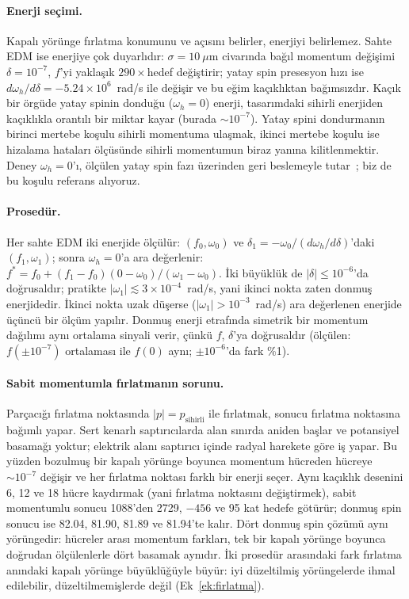 \documentclass[11pt,a4paper]{article}
\begin{document}
\paragraph{Enerji seçimi.} Kapalı yörünge fırlatma konumunu ve açısını belirler, enerjiyi belirlemez. Sahte
EDM ise enerjiye çok duyarlıdır: $\sigma=10~\mu$m civarında bağıl momentum değişimi $\delta=10^{-7}$, $f$'yi
yaklaşık $290\times$hedef değiştirir; yatay spin presesyon hızı ise $d\omega_h/d\delta=-5.24\times10^6$~rad/s
ile değişir ve bu eğim kaçıklıktan bağımsızdır. Kaçık bir örgüde yatay spinin donduğu ($\omega_h=0$) enerji,
tasarımdaki sihirli enerjiden kaçıklıkla orantılı bir miktar kayar (burada $\sim10^{-7}$). Yatay spini
dondurmanın birinci mertebe koşulu sihirli momentuma ulaşmak, ikinci mertebe koşulu ise hizalama hataları
ölçüsünde sihirli momentumun biraz yanına kilitlenmektir. Deney $\omega_h=0$'ı, ölçülen yatay spin fazı
üzerinden geri beslemeyle tutar~\cite{jedi_phaselock}; biz de bu koşulu referans alıyoruz.

\paragraph{Prosedür.} Her sahte EDM iki enerjide ölçülür: $(f_0,\omega_0)$ ve
$\delta_1=-\omega_0/(d\omega_h/d\delta)$'daki $(f_1,\omega_1)$; sonra $\omega_h=0$'a ara değerlenir:
$f^*=f_0+(f_1-f_0)(0-\omega_0)/(\omega_1-\omega_0)$. İki büyüklük de $|\delta|\le10^{-6}$'da doğrusaldır;
pratikte $|\omega_1|\lesssim3\times10^{-4}$~rad/s, yani ikinci nokta zaten donmuş enerjidedir. İkinci nokta
uzak düşerse ($|\omega_1|>10^{-3}$~rad/s) ara değerlenen enerjide üçüncü bir ölçüm yapılır. Donmuş enerji
etrafında simetrik bir momentum dağılımı aynı ortalama sinyali verir, çünkü $f$, $\delta$'ya doğrusaldır
(ölçülen: $f(\pm10^{-7})$ ortalaması ile $f(0)$ aynı; $\pm10^{-6}$'da fark \%1).

\paragraph{Sabit momentumla fırlatmanın sorunu.} Parçacığı fırlatma noktasında $|p|=p_\text{sihirli}$ ile
fırlatmak, sonucu fırlatma noktasına bağımlı yapar. Sert kenarlı saptırıcılarda alan sınırda aniden başlar ve
potansiyel basamağı yoktur; elektrik alanı saptırıcı içinde radyal harekete göre iş yapar. Bu yüzden bozulmuş
bir kapalı yörünge boyunca momentum hücreden hücreye $\sim10^{-7}$ değişir ve her fırlatma noktası farklı bir
enerji seçer. Aynı kaçıklık desenini 6, 12 ve 18 hücre kaydırmak (yani fırlatma noktasını değiştirmek), sabit
momentumlu sonucu 1088'den 2729, $-456$ ve 95 kat hedefe götürür; donmuş spin sonucu ise 82.04, 81.90, 81.89 ve
81.94'te kalır. Dört donmuş spin çözümü aynı yörüngedir: hücreler arası momentum farkları, tek bir kapalı
yörünge boyunca doğrudan ölçülenlerle dört basamak aynıdır. İki prosedür arasındaki fark fırlatma anındaki
kapalı yörünge büyüklüğüyle büyür: iyi düzeltilmiş yörüngelerde ihmal edilebilir, düzeltilmemişlerde değil
(Ek~\ref{ek:firlatma}).
\end{document}
